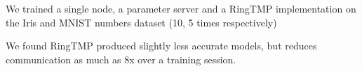 \documentclass[a4paper]{article}
\begin{document}
{\begin{multicols}{2}
        \begin{compactitem}
            \item We trained a single node, a parameter server and a RingTMP
            implementation on the Iris and MNIST numbers dataset (10, 5 times
            respectively)
            \item We found RingTMP produced slightly less accurate models,
            but reduces communication as much as 8x over a training session.
        \end{compactitem}
    
    \end{multicols}
}


 
\end{document}
